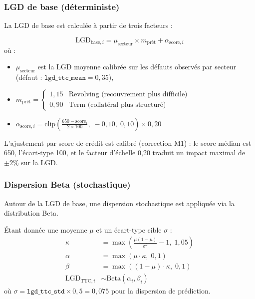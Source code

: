 \documentclass[12pt,a4paper]{article}
\begin{document}
\subsubsection{LGD de base (d\'eterministe)}

La LGD de base est calcul\'ee \`a partir de trois facteurs :

\begin{formulebox}
\begin{equation}
\label{eq:lgd_base}
\text{LGD}_{\text{base},i} = \mu_{\text{secteur}} \times m_{\text{pr\^et}} + \alpha_{\text{score},i}
\end{equation}
o\`u :
\begin{itemize}
    \item $\mu_{\text{secteur}}$ est la LGD moyenne calibr\'ee sur les d\'efauts observ\'es par secteur (d\'efaut : $\texttt{lgd\_ttc\_mean} = 0{,}35$),
    \item $m_{\text{pr\^et}} = \begin{cases} 1{,}15 & \text{Revolving (recouvrement plus difficile)} \\ 0{,}90 & \text{Term (collat\'eral plus structur\'e)} \end{cases}$
    \item $\alpha_{\text{score},i} = \text{clip}\!\left(\frac{650 - \text{score}_i}{2 \times 100},\; -0{,}10,\; 0{,}10\right) \times 0{,}20$
\end{itemize}
\end{formulebox}

L'ajustement par score de cr\'edit est calibr\'e (correction M1) : le score m\'edian est 650, l'\'ecart-type 100, et le facteur d'\'echelle 0,20 traduit un impact maximal de $\pm 2\%$ sur la LGD.

\subsubsection{Dispersion Beta (stochastique)}

Autour de la LGD de base, une dispersion stochastique est appliqu\'ee via la distribution Beta.

\begin{formulebox}
\'Etant donn\'ee une moyenne $\mu$ et un \'ecart-type cible $\sigma$ :
\begin{align}
\kappa &= \max\!\left(\frac{\mu(1-\mu)}{\sigma^2} - 1,\; 1{,}05\right) \label{eq:kappa} \\
\alpha &= \max(\mu \cdot \kappa,\; 0{,}1) \\
\beta &= \max((1-\mu) \cdot \kappa,\; 0{,}1) \\
\text{LGD}_{\text{TTC},i} &\sim \text{Beta}(\alpha_i, \beta_i) \label{eq:beta_sample}
\end{align}
o\`u $\sigma = \texttt{lgd\_ttc\_std} \times 0{,}5 = 0{,}075$ pour la dispersion de pr\'ediction.
\end{formulebox}
\end{document}
